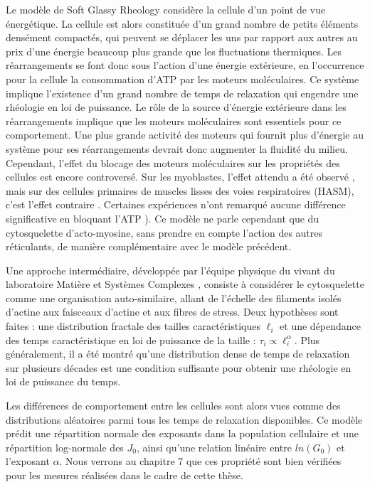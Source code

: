 Le modèle de Soft Glassy Rheology \parencite{sollich_rheological_1998} considère la cellule d'un point de vue énergétique. 
La cellule est alors constituée d'un grand nombre de petits éléments densément compactés, qui peuvent se déplacer les uns par rapport aux autres au prix d'une énergie beaucoup plus grande que les fluctuations thermiques. 
Les réarrangements se font donc sous l'action d'une énergie extérieure, en l'occurrence pour la cellule la consommation d'ATP par les moteurs moléculaires. 
Ce système implique l'existence d'un grand nombre de temps de relaxation qui engendre une rhéologie en loi de puissance. 
Le rôle de la source d'énergie extérieure dans les réarrangements implique que les moteurs moléculaires sont essentiels pour ce comportement. Une plus grande activité des moteurs qui fournit plus d'énergie au système pour ses réarrangements devrait donc augmenter la fluidité du milieu. 
Cependant, l'effet du blocage des moteurs moléculaires sur les propriétés des cellules est encore controversé. Sur les myoblastes, l'effet attendu a été observé \parencite{balland_dissipative_2005}, mais sur des cellules primaires de muscles lisses des voies respiratoires (HASM), c'est l'effet contraire \parencite{fabry_signal_2001}. Certaines expériences n'ont remarqué aucune différence significative en bloquant l'ATP \parencite{hoffman_consensus_2006}). 
Ce modèle ne parle cependant que du cytosquelette d'acto-myosine, sans prendre en compte l'action des autres réticulants, de manière complémentaire avec le modèle précédent. 

Une approche intermédiaire, développée par l'équipe physique du vivant du laboratoire Matière et Systèmes Complexes \parencite{balland_power_2006}, consiste à considérer le cytosquelette comme une organisation auto-similaire, allant de l'échelle des filaments isolés d'actine aux faisceaux d'actine et aux fibres de stress. Deux hypothèses sont faites : une distribution fractale des tailles caractéristiques $\ell_i$ et une dépendance des temps caractéristique en loi de puissance de la taille : $\tau_i \propto  \ell_i^{\alpha}$. Plus généralement, il a été montré qu'une distribution dense de temps de relaxation sur plusieurs décades est une condition suffisante pour obtenir une rhéologie en loi de puissance du temps. 
 

 Les différences de comportement entre les cellules sont alors vues comme des distributions aléatoires parmi tous les temps de relaxation disponibles. Ce modèle prédit une répartition normale des exposants dans la population cellulaire et une répartition log-normale des $J_0$, ainsi qu'une relation linéaire entre $ln(G_0)$ et l'exposant $\alpha$. Nous verrons au chapitre 7 que ces propriété sont bien vérifiées pour les mesures réalisées dans le cadre de cette thèse. 

